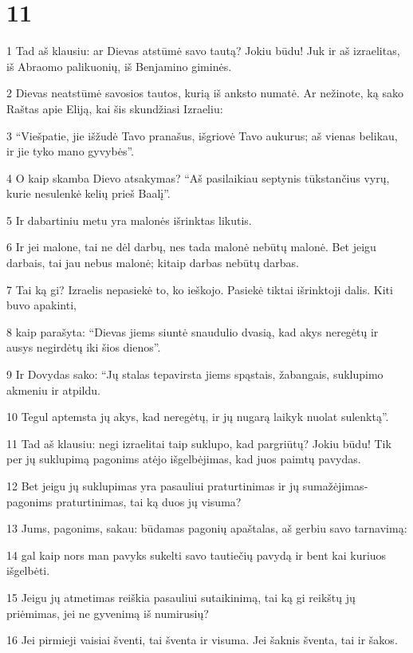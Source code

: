 \chapter{11}


\par 1 Tad aš klausiu: ar Dievas atstūmė savo tautą? Jokiu būdu! Juk ir aš izraelitas, iš Abraomo palikuonių, iš Benjamino giminės. 
\par 2 Dievas neatstūmė savosios tautos, kurią iš anksto numatė. Ar nežinote, ką sako Raštas apie Eliją, kai šis skundžiasi Izraeliu: 
\par 3 “Viešpatie, jie išžudė Tavo pranašus, išgriovė Tavo aukurus; aš vienas belikau, ir jie tyko mano gyvybės”. 
\par 4 O kaip skamba Dievo atsakymas? “Aš pasilaikiau septynis tūkstančius vyrų, kurie nesulenkė kelių prieš Baalį”. 
\par 5 Ir dabartiniu metu yra malonės išrinktas likutis. 
\par 6 Ir jei malone, tai ne dėl darbų, nes tada malonė nebūtų malonė. Bet jeigu darbais, tai jau nebus malonė; kitaip darbas nebūtų darbas. 
\par 7 Tai ką gi? Izraelis nepasiekė to, ko ieškojo. Pasiekė tiktai išrinktoji dalis. Kiti buvo apakinti, 
\par 8 kaip parašyta: “Dievas jiems siuntė snaudulio dvasią, kad akys neregėtų ir ausys negirdėtų iki šios dienos”. 
\par 9 Ir Dovydas sako: “Jų stalas tepavirsta jiems spąstais, žabangais, suklupimo akmeniu ir atpildu. 
\par 10 Tegul aptemsta jų akys, kad neregėtų, ir jų nugarą laikyk nuolat sulenktą”. 
\par 11 Tad aš klausiu: negi izraelitai taip suklupo, kad pargriūtų? Jokiu būdu! Tik per jų suklupimą pagonims atėjo išgelbėjimas, kad juos paimtų pavydas. 
\par 12 Bet jeigu jų suklupimas yra pasauliui praturtinimas ir jų sumažėjimas­pagonims praturtinimas, tai ką duos jų visuma? 
\par 13 Jums, pagonims, sakau: būdamas pagonių apaštalas, aš gerbiu savo tarnavimą: 
\par 14 gal kaip nors man pavyks sukelti savo tautiečių pavydą ir bent kai kuriuos išgelbėti. 
\par 15 Jeigu jų atmetimas reiškia pasauliui sutaikinimą, tai ką gi reikštų jų priėmimas, jei ne gyvenimą iš numirusių? 
\par 16 Jei pirmieji vaisiai šventi, tai šventa ir visuma. Jei šaknis šventa, tai ir šakos. 
